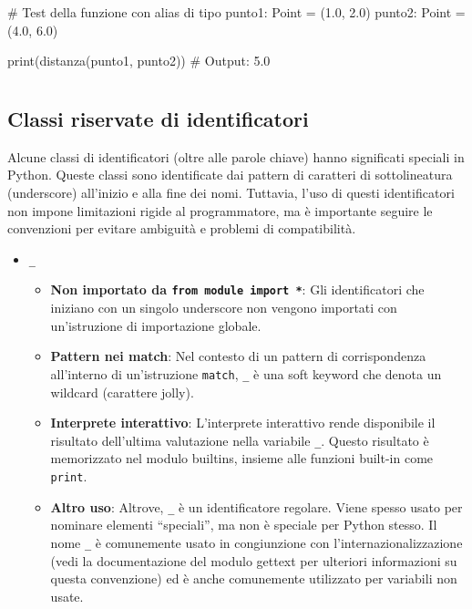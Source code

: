 \documentclass[
  letterpaper,
  DIV=11,
  numbers=noendperiod]{scrreprt}
\newenvironment{Shaded}{\begin{snugshade}}{\end{snugshade}}
\newcommand{\BuiltInTok}[1]{\textcolor[rgb]{0.00,0.23,0.31}{#1}}
\newcommand{\CommentTok}[1]{\textcolor[rgb]{0.37,0.37,0.37}{#1}}
\newcommand{\FloatTok}[1]{\textcolor[rgb]{0.68,0.00,0.00}{#1}}
\newcommand{\NormalTok}[1]{\textcolor[rgb]{0.00,0.23,0.31}{#1}}
\newcommand{\OperatorTok}[1]{\textcolor[rgb]{0.37,0.37,0.37}{#1}}
\providecommand{\tightlist}{%
  \setlength{\itemsep}{0pt}\setlength{\parskip}{0pt}}\usepackage{longtable,booktabs,array}
\begin{document}
\begin{itemize}
\begin{Shaded}
\begin{Highlighting}[]
\CommentTok{\# Test della funzione con alias di tipo}
\NormalTok{punto1: Point }\OperatorTok{=}\NormalTok{ (}\FloatTok{1.0}\NormalTok{, }\FloatTok{2.0}\NormalTok{) }
\NormalTok{punto2: Point }\OperatorTok{=}\NormalTok{ (}\FloatTok{4.0}\NormalTok{, }\FloatTok{6.0}\NormalTok{)}

\BuiltInTok{print}\NormalTok{(distanza(punto1, punto2))  }\CommentTok{\# Output: 5.0}
\end{Highlighting}
\end{Shaded}
\end{itemize}

\section{}\label{section}

\subsection{Classi riservate di
identificatori}\label{classi-riservate-di-identificatori}

Alcune classi di identificatori (oltre alle parole chiave) hanno
significati speciali in Python. Queste classi sono identificate dai
pattern di caratteri di sottolineatura (underscore) all'inizio e alla
fine dei nomi. Tuttavia, l'uso di questi identificatori non impone
limitazioni rigide al programmatore, ma è importante seguire le
convenzioni per evitare ambiguità e problemi di compatibilità.

\begin{itemize}
\tightlist
\item
  \texttt{\_}

  \begin{itemize}
  \tightlist
  \item
    \textbf{Non importato da \texttt{from\ module\ import\ *}}: Gli
    identificatori che iniziano con un singolo underscore non vengono
    importati con un'istruzione di importazione globale.
  \item
    \textbf{Pattern nei match}: Nel contesto di un pattern di
    corrispondenza all'interno di un'istruzione \texttt{match},
    \texttt{\_} è una soft keyword che denota un wildcard (carattere
    jolly).
  \item
    \textbf{Interprete interattivo}: L'interprete interattivo rende
    disponibile il risultato dell'ultima valutazione nella variabile
    \texttt{\_}. Questo risultato è memorizzato nel modulo builtins,
    insieme alle funzioni built-in come \texttt{print}.
  \item
    \textbf{Altro uso}: Altrove, \texttt{\_} è un identificatore
    regolare. Viene spesso usato per nominare elementi ``speciali'', ma
    non è speciale per Python stesso. Il nome \texttt{\_} è comunemente
    usato in congiunzione con l'internazionalizzazione (vedi la
    documentazione del modulo gettext per ulteriori informazioni su
    questa convenzione) ed è anche comunemente utilizzato per variabili
    non usate.
  \end{itemize}
\end{itemize}
\end{document}
